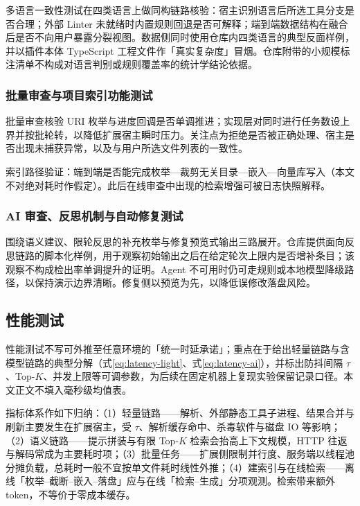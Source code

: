 多语言一致性测试在四类语言上做同构链路核验：宿主识别语言后所选工具分支是否合理；外部 Linter 未就绪时内置规则回退是否可解释；端到端数据结构在融合后是否不向用户暴露分裂视图。数据侧同时使用仓库内四类语言的典型反面样例，并以插件本体 TypeScript 工程文件作「真实复杂度」冒烟。仓库附带的小规模标注清单不构成对语言判别或规则覆盖率的统计学结论依据。

\subsubsection{批量审查与项目索引功能测试}
批量审查核验 URI 枚举与进度回调是否单调推进；实现层对同时进行任务数设上界并按批轮转，以降低扩展宿主瞬时压力。关注点为拒绝是否被正确处理、宿主是否出现未捕获异常，以及与用户所选文件列表的一致性。

索引路径验证：端到端是否能完成枚举—裁剪无关目录—嵌入—向量库写入（本文不对绝对耗时作假定）\cite{chroma2026docs,allminilm2026hf,reimers2019sentencebert}。此后在线审查中出现的检索增强可被日志快照解释。

\subsubsection{AI 审查、反思机制与自动修复测试}

围绕语义建议、限轮反思的补充枚举与修复预览式输出三路展开。仓库提供面向反思链路的脚本化样例，用于观察初始输出之后在给定轮次上限内是否增补条目；该观察不构成检出率单调提升的证明\cite{hou2024llmse}。Agent 不可用时仍可走规则或本地模型降级路径，以保持演示边界清晰。修复侧以预览为先，以降低误修改落盘风险\cite{microsoft2025vscodeapi}。

\subsection{性能测试}
\label{subsec:perf-test}

性能测试不写可外推至任意环境的「统一时延承诺」；重点在于给出轻量链路与含模型链路的典型分解（式\eqref{eq:latency-light}、式\eqref{eq:latency-ai}），并标出防抖间隔 $\tau$、Top-$K$、并发上限等可调参数，为后续在固定机器上复现实验保留记录口径。本文正文不填入毫秒级均值表。

指标体系作如下归纳：（1）轻量链路——解析、外部静态工具子进程、结果合并与刷新主要发生在扩展宿主，受 $\tau$、解析缓存命中、杀毒软件与磁盘 IO 等影响；（2）语义链路——提示拼装与有限 Top-$K$ 检索会抬高上下文规模，HTTP 往返与解码常成为主要耗时项\cite{hou2024llmse}；（3）批量任务——扩展侧限制并行度、服务端以线程池分摊负载，总耗时一般不宜按单文件耗时线性外推；（4）建索引与在线检索——离线「枚举–截断–嵌入–落盘」应与在线「检索–生成」分项观测。检索带来额外 token，不等价于零成本缓存\cite{lewis2020retrieval}。

